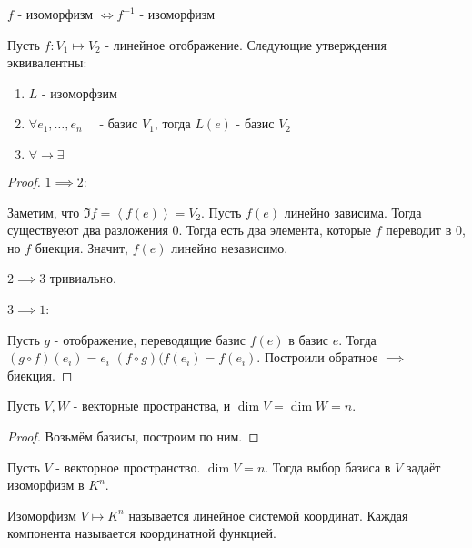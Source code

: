 \begin{remark} \thmslashn

    $f$ - изоморфизм $\iff f^{-1}$ - изоморфизм
\end{remark}
\begin{consequence} \thmslashn

    Пусть $f : V_1 \mapsto V_2$ - линейное отображение. Следующие утверждения эквивалентны:
    \begin{enumerate}
        \item $L$ - изоморфзим
        \item $\forall{e_1, \ldots, e_{n}}\quad $ - базис $V_1$, тогда $L(e)$ - базис $V_2$
        \item $\forall{} \to \exists{}\quad  $
    \end{enumerate}
    \begin{proof} \thmslashn
    
        $1 \implies 2$:

        Заметим, что $\Im f = \left<f(e)\right> = V_2$. Пусть $f(e)$ линейно зависима. Тогда существуеют два разложения $0$. Тогда есть два элемента, которые $f$ переводит в $0$, но $f$ биекция. Значит, $f(e)$ линейно независимо.

        $2 \implies 3$ тривиально.

        $3 \implies 1$:

        Пусть $g$ - отображение, переводящие базис $f(e)$ в базис $e$. Тогда $(g\circ f)(e_{i}) = e_{i}$ $(f \circ g)(f(e_{i}) = f(e_{i})$. Построили обратное $\implies$ биекция.
    \end{proof}
\end{consequence}
\begin{consequence} \thmslashn

    Пусть $V, W$ - векторные пространства, и $\dim V = \dim W = n$.
    \begin{proof} \thmslashn
    
        Возьмём базисы, построим по ним.
    \end{proof}
\end{consequence}
\begin{consequence} \thmslashn

    Пусть $V$ - векторное пространство. $\dim V = n$. Тогда выбор базиса в $V$ задаёт изоморфизм в $K^{n}$.
\end{consequence}
\begin{definition} \thmslashn 

    Изоморфизм $V \mapsto K^{n}$ называется линейное системой координат. Каждая компонента называется координатной функцией.
\end{definition}

